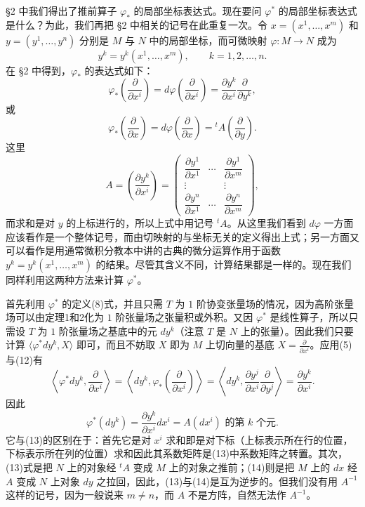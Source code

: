 §2 中我们得出了推前算子 $\varphi_*$ 的局部坐标表达式。现在要问 $\varphi^*$ 的局部坐标表达式是什么？为此，我们再把 §2 中相关的记号在此重复一次。令 $x=(x^1,\ldots,x^m)$ 和 $y=(y^1,\ldots,y^n)$ 分别是 $M$ 与 $N$ 中的局部坐标，而可微映射 $\varphi:M\to N$ 成为
\[
 y^k=y^k(x^1,\ldots,x^m),\qquad k=1,2,\ldots,n.
\]
在 §2 中得到，$\varphi_*$ 的表达式如下：
\begin{equation}
 \varphi_*\left(\frac{\partial}{\partial x^i}\right)
 =d\varphi\left(\frac{\partial}{\partial x^i}\right)
 =\frac{\partial y^k}{\partial x^i}\frac{\partial}{\partial y^k},
 \tag{12}
\end{equation}
或
\begin{equation}
 \varphi_*\left(\frac{\partial}{\partial x}\right)
 =d\varphi\left(\frac{\partial}{\partial x}\right)
 ={}^tA\left(\frac{\partial}{\partial y}\right).
 \tag{13}
\end{equation}
这里
\[
 A=\left(\frac{\partial y^k}{\partial x^i}\right)
 =\begin{pmatrix}
 \dfrac{\partial y^1}{\partial x^1}&\cdots&\dfrac{\partial y^1}{\partial x^m}\\
 \vdots&&\vdots\\
 \dfrac{\partial y^n}{\partial x^1}&\cdots&\dfrac{\partial y^n}{\partial x^m}
 \end{pmatrix},
\]
而求和是对 $y$ 的上标进行的，所以上式中用记号 ${}^tA$。从这里我们看到 $d\varphi$ 一方面应该看作是一个整体记号，而由切映射的与坐标无关的定义得出上式；另一方面又可以看作是用通常微积分教本中讲的古典的微分运算作用于函数 $y^k=y^k(x^1,\ldots,x^m)$ 的结果。尽管其含义不同，计算结果都是一样的。现在我们同样利用这两种方法来计算 $\varphi^*$。

首先利用 $\varphi^*$ 的定义(8)式，并且只需 $T$ 为 $1$ 阶协变张量场的情况，因为高阶张量场可以由定理1和2化为 $1$ 阶张量场之张量积或外积。又因 $\varphi^*$ 是线性算子，所以只需设 $T$ 为 $1$ 阶张量场之基底中的元 $dy^k$（注意 $T$ 是 $N$ 上的张量）。因此我们只要计算 $\langle\varphi^*dy^k,X\rangle$ 即可，而且不妨取 $X$ 即为 $M$ 上切向量的基底 $X=\frac{\partial}{\partial x^i}$。应用(5)与(12)有
\[
 \left\langle\varphi^*dy^k,\frac{\partial}{\partial x^i}\right\rangle
 =\left\langle dy^k,\varphi_*\left(\frac{\partial}{\partial x^i}\right)\right\rangle
 =\left\langle dy^k,\frac{\partial y^j}{\partial x^i}\frac{\partial}{\partial y^j}\right\rangle
 =\frac{\partial y^k}{\partial x^i}.
\]
因此
\begin{equation}
 \varphi^*(dy^k)=\frac{\partial y^k}{\partial x^i}dx^i=A(dx^i)\text{ 的第 }k\text{ 个元}.
 \tag{14}
\end{equation}
它与(13)的区别在于：首先它是对 $x^i$ 求和即是对下标（上标表示所在行的位置，下标表示所在列的位置）求和因此其系数矩阵是(13)中系数矩阵之转置。其次，(13)式是把 $N$ 上的对象经 ${}^tA$ 变成 $M$ 上的对象之推前；(14)则是把 $M$ 上的 $dx$ 经 $A$ 变成 $N$ 上对象 $dy$ 之拉回，因此，(13)与(14)是互为逆步的。但我们没有用 $A^{-1}$ 这样的记号，因为一般说来 $m\ne n$，而 $A$ 不是方阵，自然无法作 $A^{-1}$。

